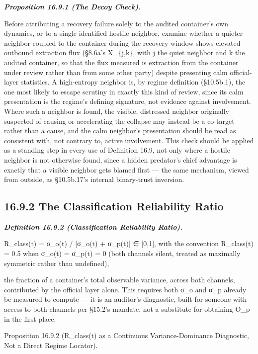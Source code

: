 \documentclass[
]{article}
\begin{document}
\emph{\textbf{Proposition 16.9.1 (The Decoy Check).}}

Before attributing a recovery failure solely to the audited container's
own dynamics, or to a single identified hostile neighbor, examine
whether a quieter neighbor coupled to the container during the recovery
window shows elevated outbound extraction flux (§8.6a's X\_\{j,k\}, with
j the quiet neighbor and k the audited container, so that the flux
measured is extraction from the container under review rather than from
some other party) despite presenting calm official-layer statistics. A
high-entropy neighbor is, by regime definition (§10.5b.1), the one most
likely to escape scrutiny in exactly this kind of review, since its calm
presentation is the regime's defining signature, not evidence against
involvement. Where such a neighbor is found, the visible, distressed
neighbor originally suspected of causing or accelerating the collapse
may instead be a co-target rather than a cause, and the calm neighbor's
presentation should be read as consistent with, not contrary to, active
involvement. This check should be applied as a standing step in every
use of Definition 16.9, not only where a hostile neighbor is not
otherwise found, since a hidden predator's chief advantage is exactly
that a visible neighbor gets blamed first --- the same mechanism, viewed
from outside, as §10.5b.17's internal binary-trust inversion.

\hypertarget{the-classification-reliability-ratio}{%
\subsection{16.9.2 The Classification Reliability
Ratio}\label{the-classification-reliability-ratio}}

\emph{\textbf{Definition 16.9.2 (Classification Reliability Ratio).}}

R\_class(t) = σ\_o(t) / {[}σ\_o(t) + σ\_p(t){]} ∈ {[}0,1{]}, with the
convention R\_class(t) = 0.5 when σ\_o(t) = σ\_p(t) = 0 (both channels
silent, treated as maximally symmetric rather than undefined),

the fraction of a container's total observable variance, across both
channels, contributed by the official layer alone. This requires both
σ\_o and σ\_p already be measured to compute --- it is an auditor's
diagnostic, built for someone with access to both channels per §15.2's
mandate, not a substitute for obtaining O\_p in the first place.

Proposition 16.9.2 (R\_class(t) as a Continuous Variance-Dominance
Diagnostic, Not a Direct Regime Locator).
\end{document}
